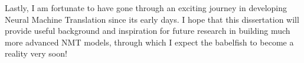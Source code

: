 Lastly, I am fortunate to have gone through an exciting journey in developing Neural Machine Translation since its early days. I hope that this dissertation will provide useful background and inspiration for future research in building much more advanced NMT models, through which I expect the babelfish to become a reality very soon!
